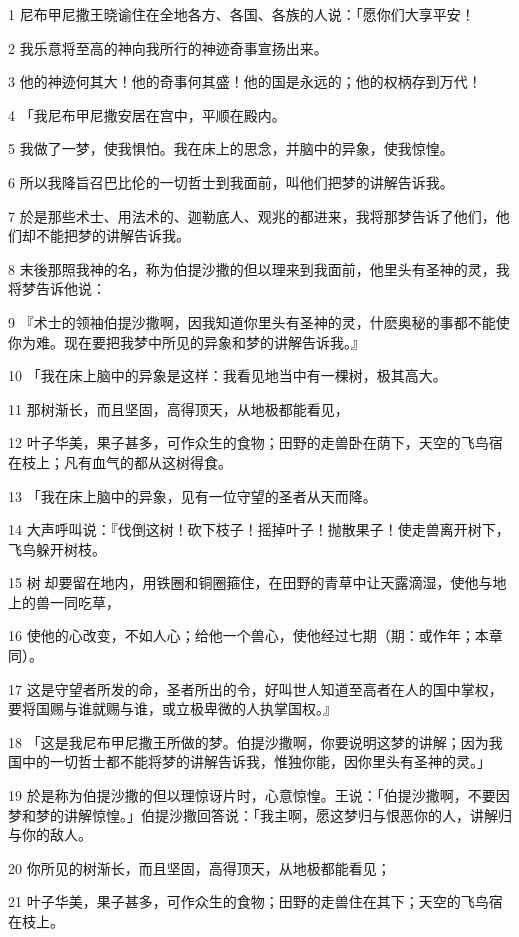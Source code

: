 \par 1 尼布甲尼撒王晓谕住在全地各方、各国、各族的人说：「愿你们大享平安！
\par 2 我乐意将至高的神向我所行的神迹奇事宣扬出来。
\par 3 他的神迹何其大！他的奇事何其盛！他的国是永远的；他的权柄存到万代！
\par 4 「我尼布甲尼撒安居在宫中，平顺在殿内。
\par 5 我做了一梦，使我惧怕。我在床上的思念，并脑中的异象，使我惊惶。
\par 6 所以我降旨召巴比伦的一切哲士到我面前，叫他们把梦的讲解告诉我。
\par 7 於是那些术士、用法术的、迦勒底人、观兆的都进来，我将那梦告诉了他们，他们却不能把梦的讲解告诉我。
\par 8 末後那照我神的名，称为伯提沙撒的但以理来到我面前，他里头有圣神的灵，我将梦告诉他说：
\par 9 『术士的领袖伯提沙撒啊，因我知道你里头有圣神的灵，什麽奥秘的事都不能使你为难。现在要把我梦中所见的异象和梦的讲解告诉我。』
\par 10 「我在床上脑中的异象是这样：我看见地当中有一棵树，极其高大。
\par 11 那树渐长，而且坚固，高得顶天，从地极都能看见，
\par 12 叶子华美，果子甚多，可作众生的食物；田野的走兽卧在荫下，天空的飞鸟宿在枝上；凡有血气的都从这树得食。
\par 13 「我在床上脑中的异象，见有一位守望的圣者从天而降。
\par 14 大声呼叫说：『伐倒这树！砍下枝子！摇掉叶子！抛散果子！使走兽离开树下，飞鸟躲开树枝。
\par 15 树却要留在地内，用铁圈和铜圈箍住，在田野的青草中让天露滴湿，使他与地上的兽一同吃草，
\par 16 使他的心改变，不如人心；给他一个兽心，使他经过七期（期：或作年；本章同）。
\par 17 这是守望者所发的命，圣者所出的令，好叫世人知道至高者在人的国中掌权，要将国赐与谁就赐与谁，或立极卑微的人执掌国权。』
\par 18 「这是我尼布甲尼撒王所做的梦。伯提沙撒啊，你要说明这梦的讲解；因为我国中的一切哲士都不能将梦的讲解告诉我，惟独你能，因你里头有圣神的灵。」
\par 19 於是称为伯提沙撒的但以理惊讶片时，心意惊惶。王说：「伯提沙撒啊，不要因梦和梦的讲解惊惶。」伯提沙撒回答说：「我主啊，愿这梦归与恨恶你的人，讲解归与你的敌人。
\par 20 你所见的树渐长，而且坚固，高得顶天，从地极都能看见；
\par 21 叶子华美，果子甚多，可作众生的食物；田野的走兽住在其下；天空的飞鸟宿在枝上。
